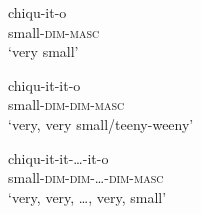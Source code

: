 \ex
\gll chiqu-it-o\\
     small-\textsc{dim-masc}\\
\glt ‘very small’

\ex
\gll chiqu-it-it-o\\
     small-\textsc{dim-dim-masc}\\
\glt ‘very, very small/teeny-weeny’

\ex
\gll chiqu-it-it-…-it-o\\
     small-\textsc{dim}-\textsc{dim}-\textsc{…}-\textsc{dim}-\textsc{masc}\\
\glt ‘very, very, …, very, small’
\z
\z
\z

